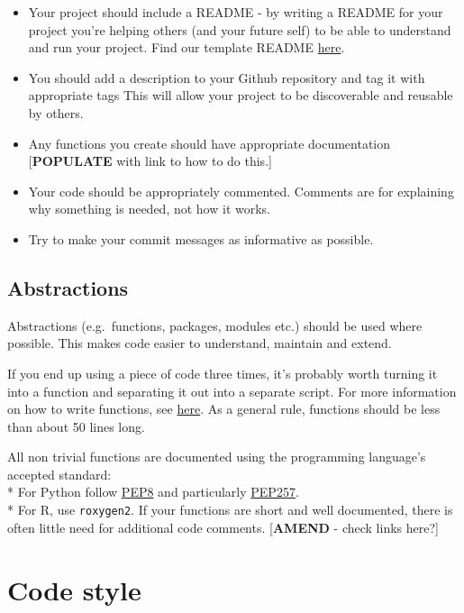 \documentclass[]{book}
\begin{document}
\begin{itemize}
\item
  Your project should include a README - by writing a README for your project you're helping others (and your future self) to be able to understand and run your project. Find our template README \href{https://github.com/moj-analytical-services/our-coding-standards/blob/master/README_template.md}{here}.
\item
  You should add a description to your Github repository and tag it with appropriate tags This will allow your project to be discoverable and reusable by others.
\item
  Any functions you create should have appropriate documentation {[}\textbf{POPULATE} with link to how to do this.{]}
\item
  Your code should be appropriately commented. Comments are for explaining why something is needed, not how it works.
\item
  Try to make your commit messages as informative as possible.
\end{itemize}

\hypertarget{functions}{%
\subsection*{Abstractions}\label{functions}}

Abstractions (e.g.~functions, packages, modules etc.) should be used where possible. This makes code easier to understand, maintain and extend.

If you end up using a piece of code three times, it's probably worth turning it into a function and separating it out into a separate script. For more information on how to write functions, see \href{https://github.com/moj-analytical-services/writing_functions_in_r}{here}. As a general rule, functions should be less than about 50 lines long.

All non trivial functions are documented using the programming language's accepted standard:\\
* For Python follow \href{https://www.python.org/dev/peps/pep-0008/}{PEP8} and particularly \href{https://www.python.org/dev/peps/pep-0257/}{PEP257}.\\
* For R, use \texttt{roxygen2}.
If your functions are short and well documented, there is often little need for additional code comments.
{[}\textbf{AMEND} - check links here?{]}

\hypertarget{style}{%
\section{Code style}\label{style}}
\end{document}
